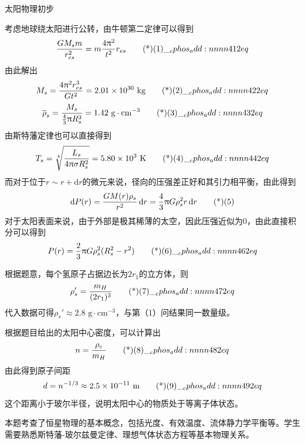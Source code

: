 \documentclass[exam]{cphos}
\begin{document}
\begin{problem}[40]{太阳物理初步}
\begin{solution}
考虑地球绕太阳进行公转，由牛顿第二定律可以得到
\begin{equation}
    \frac{GM_s m}{r_{es}^2} = m \frac{4\uppi^2}{t^2} r_{es} \eqtagscore{1}{2}
\end{equation}
由此解出
\begin{equation}
    M_s = \frac{4\uppi^2 r_{es}^3}{Gt^2} = 2.01 \times 10^{30} \text{~kg} \eqtagscore{2}{2}
\end{equation}
\begin{equation}
    \overline{\rho}_s = \frac{M_s}{\frac{4}{3}\uppi R_s^3} = 1.42 \text{~g}\cdot\text{cm}^{-3} \eqtagscore{3}{2}
\end{equation}
由斯特藩定律也可以直接得到
\begin{equation}
    T_s = \sqrt[4]{\frac{L_s}{4\uppi\sigma R_s^2}} = 5.80 \times 10^{3} \text{~K} \eqtagscore{4}{2}
\end{equation}
而对于位于$r\sim r+\mathrm{d}r$的微元来说，径向的压强差正好和其引力相平衡，由此得到
\begin{equation}
    \mathrm{d}P(r) = \frac{GM(r)\rho_s}{r^2}\,\mathrm{d}r = \frac{4}{3}\uppi G\rho_s^2 r\,\mathrm{d}r \eqtag{5}
\end{equation}
对于太阳表面来说，由于外部是极其稀薄的太空，因此压强近似为0，由此直接积分可以得到
\begin{equation}
    P(r) = \frac{2}{3}\uppi G\rho_s^2(R_s^2 - r^2) \eqtagscore{6}{2}
\end{equation}

根据题意，每个氢原子占据边长为$2r_1$的立方体，则
\begin{equation}
    \rho_s' = \frac{m_H}{(2r_1)^3} \eqtagscore{7}{2}
\end{equation}
代入数据可得$\rho_s' \approx 2.8\text{~g}\cdot\text{cm}^{-3}$，与第（1）问结果同一数量级。

根据题目给出的太阳中心密度，可以计算出
\begin{equation}
    n = \frac{\rho_c}{m_H} \eqtagscore{8}{2}
\end{equation}
由此得到原子间距
\begin{equation}
    d = n^{-1/3} \approx 2.5 \times 10^{-11} \text{~m} \eqtagscore{9}{2}
\end{equation}
这个距离小于玻尔半径，说明太阳中心的物质处于等离子体状态。

\scoring

\begin{problemappendix}
本题考查了恒星物理的基本概念，包括光度、有效温度、流体静力学平衡等。学生需要熟悉斯特藩-玻尔兹曼定律、理想气体状态方程等基本物理关系。
\end{problemappendix}

\end{solution}

\end{problem}
\end{document}
